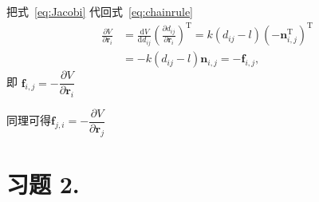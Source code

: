 \documentclass[fontset=fandol,12pt,a4paper]{ctexart}
\begin{document}
把式~\eqref{eq:Jacobi} 代回式~\eqref{eq:chainrule}
\begin{equation}
	\label{eq:gradV}
	\begin{aligned}
		\frac{\partial V}{\partial \boldsymbol{r}_{i}}
		&=\frac{\mathrm{d} V}{\mathrm{d} d_{i j}}\left(\frac{\partial d_{i j}}{\partial \boldsymbol{r}_{i}}\right)^{\mathrm{T}}
		=k\left(d_{i j}-l\right)\left(-\boldsymbol{n}_{i, j}^{\mathrm{T}}\right)^{\mathrm{T}} \\
		&=-k\left(d_{i j}-l\right) \boldsymbol{n}_{i, j}
		=-\boldsymbol{f}_{i, j} ,
	\end{aligned}
\end{equation}
即 $\boldsymbol{f}_{i, j}=-\dfrac{\partial V}{\partial \boldsymbol{r}_{i}}$

同理可得$\boldsymbol{f}_{j, i}=-\dfrac{\partial V}{\partial \boldsymbol{r}_{j}}$

\section{习题 2.}
\end{document}
